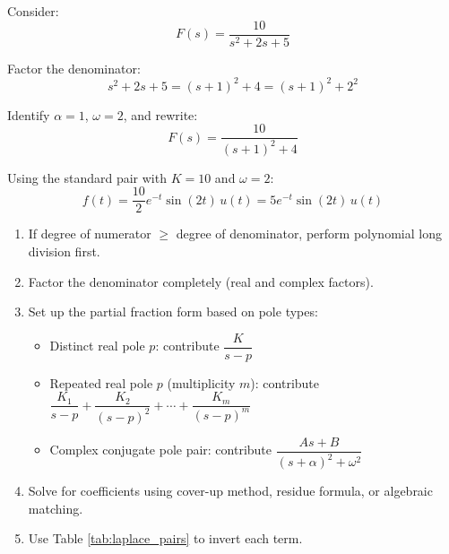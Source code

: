 \begin{examplebox}[title=Example: Complex Conjugate Poles]

Consider:
\begin{equation*}
    F(s) = \frac{10}{s^2 + 2s + 5}
\end{equation*}

Factor the denominator:
\begin{equation*}
    s^2 + 2s + 5 = (s+1)^2 + 4 = (s+1)^2 + 2^2
\end{equation*}

Identify $\alpha = 1$, $\omega = 2$, and rewrite:
\begin{equation*}
    F(s) = \frac{10}{(s+1)^2 + 4}
\end{equation*}

Using the standard pair with $K=10$ and $\omega=2$:
\begin{equation*}
    f(t) = \frac{10}{2} e^{-t} \sin(2t) \, u(t) = 5 e^{-t} \sin(2t) \, u(t)
\end{equation*}

\end{examplebox}

\begin{practicalbox}[title=Strategy for Partial Fractions]
\begin{enumerate}
    \item If degree of numerator $\geq$ degree of denominator, perform polynomial long division first.
    \item Factor the denominator completely (real and complex factors).
    \item Set up the partial fraction form based on pole types:
    \begin{itemize}
        \item Distinct real pole $p$: contribute $\dfrac{K}{s-p}$
        \item Repeated real pole $p$ (multiplicity $m$): contribute $\dfrac{K_1}{s-p} + \dfrac{K_2}{(s-p)^2} + \cdots + \dfrac{K_m}{(s-p)^m}$
        \item Complex conjugate pole pair: contribute $\dfrac{As+B}{(s+\alpha)^2 + \omega^2}$
    \end{itemize}
    \item Solve for coefficients using cover-up method, residue formula, or algebraic matching.
    \item Use Table \ref{tab:laplace_pairs} to invert each term.
\end{enumerate}
\end{practicalbox}

